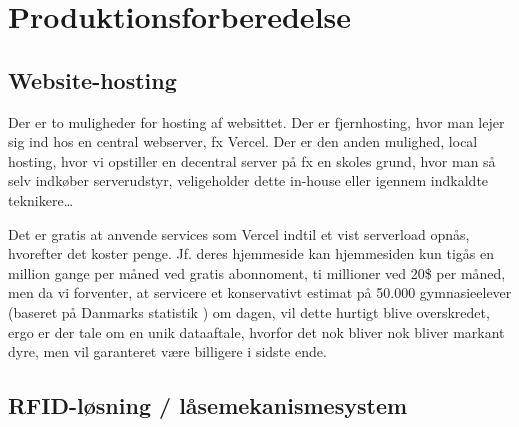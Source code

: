 \section{Produktionsforberedelse}
    \subsection{Website-hosting}
        Der er to muligheder for hosting af websittet.
        Der er fjernhosting, hvor man lejer sig ind hos en central webserver, fx Vercel.
        Der er den anden mulighed, local hosting, hvor vi opstiller en decentral server på fx en skoles grund, hvor man så selv indkøber serverudstyr, veligeholder dette in-house eller igennem indkaldte teknikere\dots

        Det er gratis at anvende services som Vercel indtil et vist serverload opnås, hvorefter det koster penge. Jf. deres hjemmeside\cite{vercelprincing} kan hjemmesiden kun tigås en million gange per måned ved gratis abonnoment, ti millioner ved 20\$ per måned, men da vi forventer, at servicere et konservativt estimat på 50.000 gymnasieelever (baseret på Danmarks statistik \cite{ungudd}) om dagen, vil dette hurtigt blive overskredet, ergo er der tale om en unik dataaftale, hvorfor det nok bliver nok bliver markant dyre, men vil garanteret være billigere i sidste ende.

    \subsection{RFID-løsning /  låsemekanismesystem}
